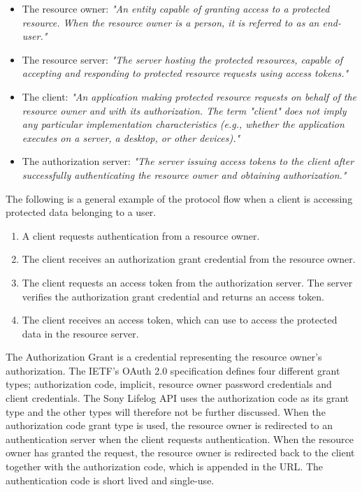 \documentclass{cslthse-msc}
\begin{document}
\begin{itemize}
	\item The resource owner: \textit{"An entity capable of granting access to a protected resource. When the resource owner is a person, it is referred to as an end-user."}
	\item The resource server: \textit{"The server hosting the protected resources, capable of accepting and responding to protected resource requests using access tokens."}
	\item The client: \textit{"An application making protected resource requests on behalf of the resource owner and with its authorization. The term "client" does not imply any particular implementation characteristics (e.g., whether the application executes on a server, a desktop, or other devices)."}
	\item The authorization server: \textit{"The server issuing access tokens to the client after successfully authenticating the resource owner and obtaining authorization."}
\end{itemize}

The following is a general example of the protocol flow when a client is accessing protected data belonging to a user. 

\begin{enumerate}
	\item A client requests authentication from a resource owner. 
	\item The client receives an authorization grant credential from the resource owner.    
	\item The client requests an access token from the authorization server. The server verifies the authorization grant credential and returns an access token. 
	\item The client receives an access token, which can use to access the protected data in the resource server. 
\end{enumerate}

The Authorization Grant is a credential representing the resource owner's authorization. The IETF's OAuth 2.0 specification defines four different grant types; authorization code, implicit, resource owner password credentials and client credentials. The Sony Lifelog API uses the authorization code as its grant type and the other types will therefore not be further discussed\cite{LifeLogAuth}. When the authorization code grant type is used, the resource owner is redirected to an authentication server when the client requests authentication. When the resource owner has granted the request, the resource owner is redirected back to the client together with the authorization code, which is appended in the URL. The authentication code is short lived and single-use.
\end{document}
